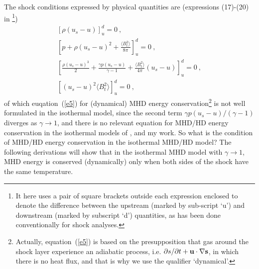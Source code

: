 \documentclass[fleqn,usenatbib]{mnras}
\begin{document}
The shock conditions expressed by physical quantities are (expressions (17)-(20) in \citet{wang2008dynamic}\footnote{It here uses a pair of square brackets outside each expression enclosed to denote the difference between the upstream (marked by sub-script `u') and downstream (marked by subscript `d') quantities, as has been done conventionally for shock analyses.})
\begin{gather}
\left[\rho\left(u_{s}-u\right)\right]_{u}^{d}=0\ ,\label{e3}\\
\left[p+\rho\left(u_{s}-u\right)^{2}+\frac{\langle B_{t}^{2}\rangle}{8\pi}\right]_{u}^{d}=0\ ,\label{e4}\\
\left[\frac{\rho\left(u_{s}-u\right)^{3}}{2}+\frac{\gamma p\left(u_{s}-u\right)}{\gamma-1}+\frac{\langle B_{t}^{2}\rangle}{4\pi}\left(u_{s}-u\right)\right]_{u}^{d}=0\ ,\label{e5}\\
\left[\left(u_{s}-u\right)^{2}\langle B_{t}^{2}\rangle\right]_{u}^{d}=0\ ,\label{e6}
\end{gather}
of which euqation~(\ref{e5}) for (dynamical) MHD energy conservation\footnote{Actually, equation~(\ref{e5}) is based on the presupposition that gas around the shock layer experience an adiabatic process, i.e. $\partial s/\partial t+\bf{u}\cdot\nabla s$, in which there is no heat flux, and that is why we use the qualifier `dynamical'.} is not well formulated in the isothermal model, since the second term $\gamma p\left(u_{s}-u\right)/(\gamma-1)$ diverges as $\gamma\rightarrow 1$, and there is no relevant equation for MHD/HD energy conservation in the isothermal models of \citet{lou2014self}, \citet{yuLou2006} and my work. So what is the condition of MHD/HD energy conservation in the isothermal MHD/HD model? The following derivations will show that in the isothermal MHD model with $\gamma\rightarrow 1$, MHD energy is conserved (dynamically) only when both sides of the shock have the same temperature.
\end{document}
